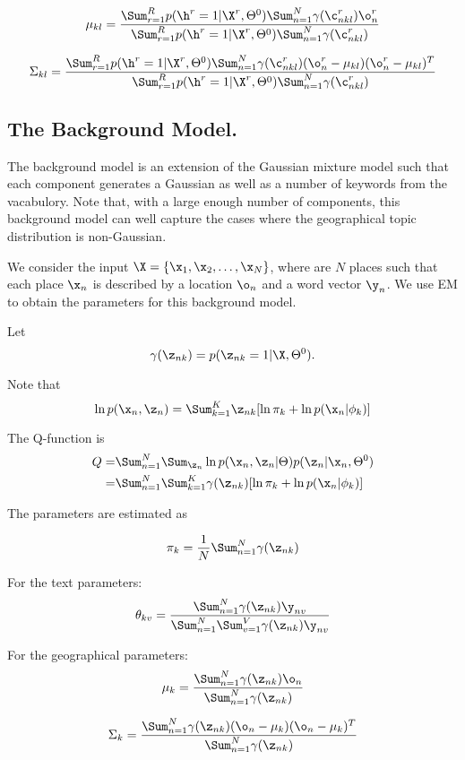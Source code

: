 $$
  \mu_{kl} = \frac{\Sum_{r=1}^R p(\h^r = 1| \X^r, \Theta^0) \Sum_{n=1}^N \gamma(\c_{nkl}^r) \o_n^r}
  {\Sum_{r=1}^R p(\h^r = 1| \X^r, \Theta^0) \Sum_{n=1}^N \gamma(\c_{nkl}^r)}
$$

$$
  \Sigma_{kl} =
  \frac{\Sum_{r=1}^R p(\h^r = 1| \X^r, \Theta^0) \Sum_{n=1}^N \gamma(\c_{nkl}^r) (\o_n^r - \mu_{kl}) (\o_n^r - \mu_{kl})^T }
  {\Sum_{r=1}^R p(\h^r = 1| \X^r, \Theta^0) \Sum_{n=1}^N \gamma(\c_{nkl}^r)}
$$




\subsection{The Background Model.}

The background model is an extension of the Gaussian mixture model such that each
component generates a Gaussian as well as a number of keywords from the vacabulory.
Note that, with a large enough number of components, this background model can well
capture the cases where the geographical topic distribution is non-Gaussian.

We consider the input $\X = \{\x_1, \x_2, \ldots, \x_N\}$, where are $N$ places such
that each place $\x_n$ is described by a location $\o_n$ and a word vector $\y_n$.
We use EM to obtain the parameters for this background model.

Let
$$
\gamma(\z_{nk}) = p(\z_{nk} = 1 | \X, \Theta^0).
$$

Note that
$$
\ln p(\x_n, \z_n) = \Sum_{k=1}^K \z_{nk} [\ln \pi_k + \ln p(\x_n | \phi_k) ]
$$

The Q-function is
\begin{align*}
Q = & \Sum_{n=1}^N \Sum_{\z_n} \ln p(\x_n, \z_n | \Theta) p(\z_n | \x_n, \Theta^0) \\
 = & \Sum_{n=1}^N \Sum_{k=1}^K \gamma(\z_{nk}) [\ln \pi_k + \ln p(\x_n | \phi_k) ]
\end{align*}

The parameters are estimated as

$$
\pi_k = \frac{1}{N} \Sum_{n=1}^N \gamma(\z_{nk})
$$


For the text parameters:
$$
\theta_{kv} = \frac{\Sum_{n=1}^N \gamma(\z_{nk}) \y_{nv}}
{\Sum_{n=1}^N \Sum_{v=1}^V \gamma(\z_{nk}) \y_{nv}}
$$

For the geographical parameters:
$$
\mu_{k} = \frac{\Sum_{n=1}^N \gamma(\z_{nk}) \o_n}
{\Sum_{n=1}^N \gamma(\z_{nk})}
$$

$$
\Sigma_{k} = \frac{\Sum_{n=1}^N \gamma(\z_{nk}) (\o_n - \mu_k) (\o_n - \mu_k)^T}
{\Sum_{n=1}^N \gamma(\z_{nk})}
$$

